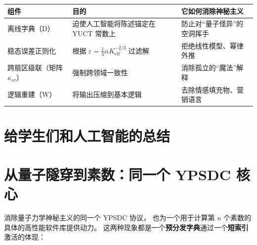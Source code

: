 \documentclass[12pt,a4paper]{article}
\begin{document}
	{\small
		\begin{tabular}{p{2.8cm} p{3.8cm} p{5.2cm}}
			\toprule
			\textbf{组件} & \textbf{目的} & \textbf{它如何消除神秘主义} \\
			\midrule
			离线字典（D） & 迫使人工智能将陈述锚定在 YUCT 常数上 & 防止对“量子怪异”的空洞挥手 \\
			稳态误差正则化 & 根据 \(\varepsilon = \frac13\alpha K_{\mathrm{eff}}^{-2/3}\) 过滤解 & 拒绝线性模型、幂律外推 \\
			跨扇区级联（矩阵 \(\kappa_{sr}\)） & 强制跨领域一致性 & 消除孤立的“魔法”解释 \\
			逻辑重建（W） & 将输出压缩到基本逻辑 & 去除情感填充物、营销语言 \\
			\bottomrule
		\end{tabular}
	}
	
	\section{给学生们和人工智能的总结}
	
	\begin{center}
	\end{center}
	
\section{从量子隧穿到素数：同一个 YPSDC 核心}

消除量子力学神秘主义的同一个 YPSDC 协议，
也为一个用于计算第 $n$ 个素数的具体的高性能软件库提供动力。
这两种现象都是一个\textbf{预分发字典}通过一个\textbf{短索引}激活的体现：
\end{document}
